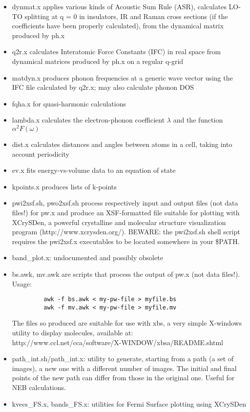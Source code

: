 \documentclass[12pt,a4paper]{article}
\begin{document}
\begin{itemize}
\item dynmat.x applies various kinds of Acoustic Sum Rule (ASR),
  calculates LO-TO splitting at q = 0 in insulators, IR and Raman
  cross sections (if the coefficients have been properly calculated),
  from the dynamical matrix produced by ph.x 
\item q2r.x calculates Interatomic Force Constants (IFC) in real space
  from dynamical matrices produced by ph.x on a regular q-grid 
\item  matdyn.x produces phonon frequencies at a generic wave vector
  using the IFC file calculated by q2r.x; may also calculate phonon DOS 
\item fqha.x for quasi-harmonic calculations 
\item lambda.x calculates the electron-phonon coefficient $\lambda$ and the
  function $\alpha^2F(\omega)$ 
\item dist.x calculates distances and angles between atoms in a cell,
  taking into account periodicity 
\item ev.x fits energy-vs-volume data to an equation of state
\item kpoints.x produces lists of k-points
\item pwi2xsf.sh, pwo2xsf.sh process respectively input and output
  files (not data files!) for pw.x and produce an XSF-formatted file
  suitable for plotting with XCrySDen, a powerful crystalline and
  molecular structure visualization program
  (http://www.xcrysden.org/). BEWARE: the pwi2xsf.sh shell script
  requires the pwi2xsf.x executables to be located somewhere in your
  \$PATH. 
\item band\_plot.x: undocumented and possibly obsolete 
\item bs.awk, mv.awk are scripts that process the output of pw.x (not
data files!). Usage: 
\begin{verbatim}
         awk -f bs.awk < my-pw-file > myfile.bs
         awk -f mv.awk < my-pw-file > myfile.mv
\end{verbatim}
The files so produced are suitable for use with xbs, a very simple
X-windows utility to display molecules, available at:\\
http://www.ccl.net/cca/software/X-WINDOW/xbsa/README.shtml 
\item path\_int.sh/path\_int.x: utility to generate, starting from a
  path (a set of images), a new one with a different number of
  images. The initial and final points of the new path can differ from
  those in the original one. Useful for NEB calculations. 
\item kvecs\_FS.x, bands\_FS.x: utilities for Fermi Surface plotting
  using XCrySDen
\end{itemize}
\end{document}
